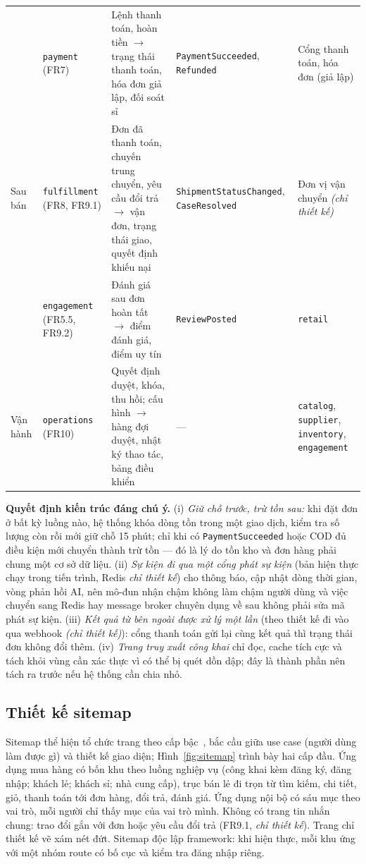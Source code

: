 \begin{longtable}{L{1.55cm} L{2.40cm} L{5.00cm} L{2.85cm} L{2.40cm}}
& \texttt{payment} (FR7) & Lệnh thanh toán, hoàn tiền $\rightarrow$ trạng thái thanh toán, hóa đơn giả lập, đối soát sỉ & \texttt{PaymentSucceeded}, \texttt{Refunded} & Cổng thanh toán, hóa đơn (giả lập) \\
Sau bán & \texttt{fulfillment} (FR8, FR9.1) & Đơn đã thanh toán, chuyến trung chuyển, yêu cầu đổi trả $\rightarrow$ vận đơn, trạng thái giao, quyết định khiếu nại & \texttt{ShipmentStatusChanged}, \texttt{CaseResolved} & Đơn vị vận chuyển \emph{(chỉ thiết kế)} \\
& \texttt{engagement} (FR5.5, FR9.2) & Đánh giá sau đơn hoàn tất $\rightarrow$ điểm đánh giá, điểm uy tín & \texttt{ReviewPosted} & \texttt{retail} \\
Vận hành & \texttt{operations} (FR10) & Quyết định duyệt, khóa, thu hồi; cấu hình $\rightarrow$ hàng đợi duyệt, nhật ký thao tác, bảng điều khiển & --- & \texttt{catalog}, \texttt{supplier}, \texttt{inventory}, \texttt{engagement} \\
\end{longtable}
\endgroup

\noindent\textbf{Quyết định kiến trúc đáng chú ý.} (i) \emph{Giữ chỗ trước, trừ tồn sau:} khi đặt đơn ở bất kỳ luồng nào, hệ thống khóa dòng tồn trong một giao dịch, kiểm tra số lượng còn rồi mới giữ chỗ 15 phút; chỉ khi có \texttt{PaymentSucceeded} hoặc COD đủ điều kiện mới chuyển thành trừ tồn --- đó là lý do tồn kho và đơn hàng phải chung một cơ sở dữ liệu. (ii) \emph{Sự kiện đi qua một cổng phát sự kiện} (bản hiện thực chạy trong tiến trình, Redis \emph{chỉ thiết kế}) cho thông báo, cập nhật dòng thời gian, vòng phản hồi AI, nên mô-đun nhận chậm không làm chậm người dùng và việc chuyển sang Redis hay message broker chuyên dụng về sau không phải sửa mã phát sự kiện. (iii) \emph{Kết quả từ bên ngoài được xử lý một lần} (theo thiết kế đi vào qua webhook \emph{(chỉ thiết kế)}): cổng thanh toán gửi lại cùng kết quả thì trạng thái đơn không đổi thêm. (iv) \emph{Trang truy xuất công khai} chỉ đọc, cache tích cực và tách khỏi vùng cần xác thực vì có thể bị quét dồn dập; đây là thành phần nên tách ra trước nếu hệ thống cần chia nhỏ.

\subsection{Thiết kế sitemap}
\label{sec:sitemap}

Sitemap thể hiện tổ chức trang theo cấp bậc~\cite{nngroup_sitemap}, bắc cầu giữa use case (người dùng làm được gì) và thiết kế giao diện; Hình~\ref{fig:sitemap} trình bày hai cấp đầu. Ứng dụng mua hàng có bốn khu theo luồng nghiệp vụ (công khai kèm đăng ký, đăng nhập; khách lẻ; khách sỉ; nhà cung cấp), trục bán lẻ đi trọn từ tìm kiếm, chi tiết, giỏ, thanh toán tới đơn hàng, đổi trả, đánh giá. Ứng dụng nội bộ có sáu mục theo vai trò, mỗi người chỉ thấy mục của vai trò mình. Không có trang tin nhắn chung: trao đổi gắn với đơn hoặc yêu cầu đổi trả (FR9.1, \emph{chỉ thiết kế}). Trang chỉ thiết kế vẽ xám nét đứt. Sitemap độc lập framework: khi hiện thực, mỗi khu ứng với một nhóm route có bố cục và kiểm tra đăng nhập riêng.

